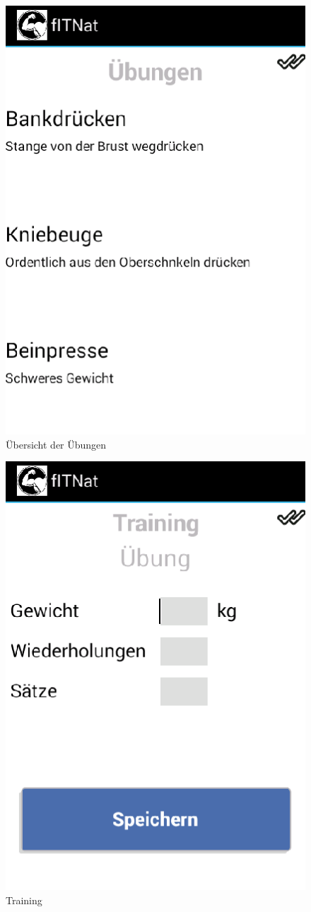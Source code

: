 \begin{figure}[!h]
\centering
\includegraphics[width=0.5\linewidth]{content/images/App/Uebungen}
\caption{{\"U}bersicht der {\"U}bungen}
\label{pic:natAppÜbungen}
\end{figure}
\begin{figure}[!h]
\centering
\includegraphics[width=0.5\linewidth]{content/images/App/Training}
\caption{Training}
\label{pic:natAppTraining}
\end{figure}
